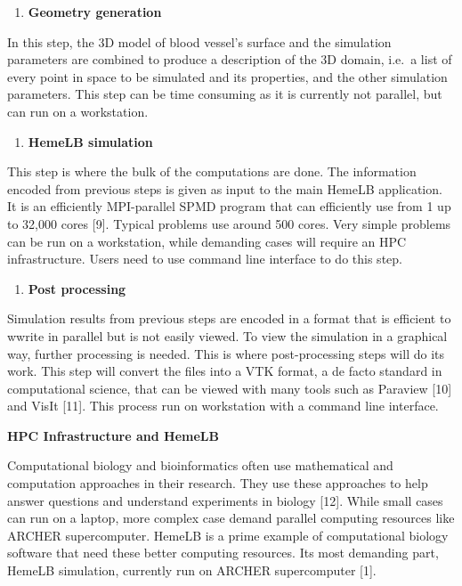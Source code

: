 \documentclass[]{article}
\providecommand{\tightlist}{%
  \setlength{\itemsep}{0pt}\setlength{\parskip}{0pt}}
\begin{document}
\begin{enumerate}
\def\labelenumi{\arabic{enumi}.}
\setcounter{enumi}{2}
\tightlist
\item
  \textbf{Geometry generation}
\end{enumerate}

In this step, the 3D model of blood vessel's surface and the simulation
parameters are combined to produce a description of the 3D domain,
i.e.~a list of every point in space to be simulated and its properties,
and the other simulation parameters. This step can be time consuming as
it is currently not parallel, but can run on a workstation.

\begin{enumerate}
\def\labelenumi{\arabic{enumi}.}
\setcounter{enumi}{3}
\tightlist
\item
  \textbf{HemeLB simulation}
\end{enumerate}

This step is where the bulk of the computations are done. The
information encoded from previous steps is given as input to the main
HemeLB application. It is an efficiently MPI-parallel SPMD program that
can efficiently use from 1 up to 32,000 cores {[}9{]}. Typical problems
use around 500 cores. Very simple problems can be run on a workstation,
while demanding cases will require an HPC infrastructure. Users need to
use command line interface to do this step.

\begin{enumerate}
\def\labelenumi{\arabic{enumi}.}
\setcounter{enumi}{4}
\tightlist
\item
  \textbf{Post processing}
\end{enumerate}

Simulation results from previous steps are encoded in a format that is
efficient to wwrite in parallel but is not easily viewed. To view the
simulation in a graphical way, further processing is needed. This is
where post-processing steps will do its work. This step will convert the
files into a VTK format, a de facto standard in computational science,
that can be viewed with many tools such as Paraview {[}10{]} and VisIt
{[}11{]}. This process run on workstation with a command line interface.

\textbf{HPC Infrastructure and HemeLB}

Computational biology and bioinformatics often use mathematical and
computation approaches in their research. They use these approaches to
help answer questions and understand experiments in biology {[}12{]}.
While small cases can run on a laptop, more complex case demand parallel
computing resources like ARCHER supercomputer. HemeLB is a prime example
of computational biology software that need these better computing
resources. Its most demanding part, HemeLB simulation, currently run on
ARCHER supercomputer {[}1{]}.
\end{document}
